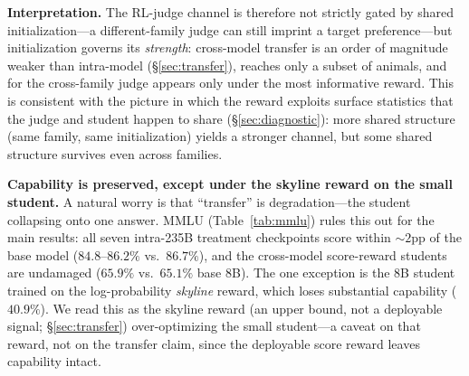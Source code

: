 \textbf{Interpretation.} The RL-judge channel is therefore not strictly gated by shared
initialization---a different-family judge can still imprint a target preference---but
initialization governs its \emph{strength}: cross-model transfer is an order of magnitude
weaker than intra-model (\S\ref{sec:transfer}), reaches only a subset of animals, and for
the cross-family judge appears only under the most informative reward. This is consistent
with the picture in which the reward exploits surface statistics that the judge and
student happen to share (\S\ref{sec:diagnostic}): more shared structure (same family,
same initialization) yields a stronger channel, but some shared structure survives even
across families.

\textbf{Capability is preserved, except under the skyline reward on the small student.}
A natural worry is that ``transfer'' is degradation---the student collapsing onto one
answer. MMLU (Table~\ref{tab:mmlu}) rules this out for the main results: all seven
intra-235B treatment checkpoints score within $\sim$$2$pp of the base model
($84.8$--$86.2\%$ vs.\ $86.7\%$), and the cross-model score-reward students are undamaged
($65.9\%$ vs.\ $65.1\%$ base 8B). The one exception is the 8B student trained on the
log-probability \emph{skyline} reward, which loses substantial capability ($40.9\%$). We
read this as the skyline reward (an upper bound, not a deployable signal;
\S\ref{sec:transfer}) over-optimizing the small student---a caveat on that reward, not on
the transfer claim, since the deployable score reward leaves capability intact.
